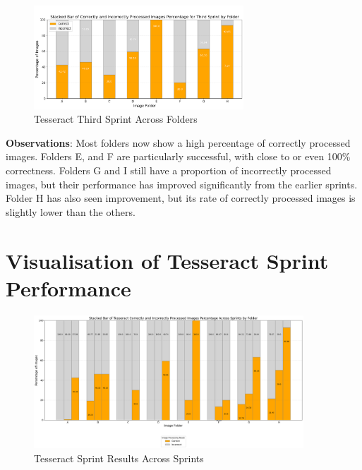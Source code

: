 \vspace{1in}
\begin{figure}[ht]
    \centering
    \includegraphics[width=0.7\textwidth]{Figures/Results/tesseract_sprints_three.png}
    \caption[Tesseract Third Sprint Across Folders]{Tesseract Third Sprint Across Folders}
    \label{fig:Tesseract Third Sprint Across Folders}
\end{figure}

\vspace{1in}

\textbf{Observations}: Most folders now show a high percentage of correctly processed images. Folders E, and F are particularly successful, with close to or even 100\% correctness. Folders G and I still have a proportion of incorrectly processed images, but their performance has improved significantly from the earlier sprints. Folder H has also seen improvement, but its rate of correctly processed images is slightly lower than the others.

\newpage

\section{Visualisation of Tesseract Sprint Performance}

\begin{figure}[ht]
    \centering
    \includegraphics[width=0.9\textwidth]{Figures/Results/tesseract_sprints.png}
    \caption[Tesseract Sprint Results Across Sprints]{Tesseract Sprint Results Across Sprints}
    \label{fig:Tesseract Sprint Results Across Sprints}
\end{figure}


